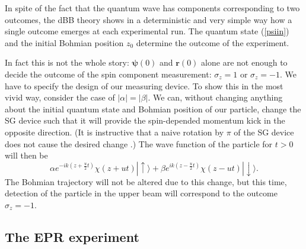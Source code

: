 \documentclass[12pt,preprint,tightenlines]{elsarticle}
\begin{document}
In spite of the fact that the quantum wave has components corresponding
to two outcomes, the dBB theory shows in a deterministic and very
simple way how a single outcome emerges at each experimental run.
The quantum state (\ref{psiin}) and the initial Bohmian position
$z_{0}$ determine the outcome of the experiment.

In fact this is not the whole story: $\boldsymbol{\psi}(0)$ and $\mathbf{r}(0)$
alone are not enough to decide the outcome of the spin component measurement:
$\sigma_{z}=1$ or $\sigma_{z}=-1$. We have to specify the design
of our measuring device. To show this in the most vivid way,  consider the case of $|\alpha|=|\beta|$. We can, without changing anything about the
initial quantum state and Bohmian position of our particle, change the SG device such that it will provide the  spin-depended momentum kick
in the opposite direction. (It is instructive that a naive rotation by $\pi$ of the SG device does not cause the desired change \cite{Ghirardi}.) The wave function of the particle for $t>0$
will then be
 \begin{equation}
\alpha e^{-ik(z+\frac{u}{2}t)}\chi(z+ut)|\uparrow\rangle+\beta e^{ik(z-\frac{u}{2}t)}\chi(z-ut)|\downarrow\rangle.\label{psioutnox+}
\end{equation}
 The Bohmian trajectory will not be altered due to this change,
but this time, detection of the particle in the upper beam will correspond
to the outcome $\sigma_{z}=-1$.


\subsection{ The EPR experiment}
\end{document}
